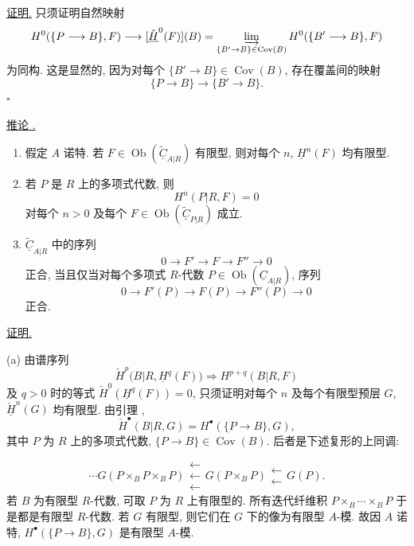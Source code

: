 \underline{证明.} 只须证明自然映射
\[
 H^0(\{P\longrightarrow B\},F)
 \longrightarrow[\check{\underline H}^{0}(F)](B)
 =\varinjlim_{\{B'\to B\}\in\operatorname{Cov}(B)}
   H^0(\{B'\longrightarrow B\},F)
\]
为同构. 这是显然的, 因为对每个
$\{B'\longrightarrow B\}\in\operatorname{Cov}(B)$, 存在覆盖间的映射
\[
 \{P\longrightarrow B\}\longrightarrow
 \{B'\longrightarrow B\}.
\]
\hfill$\square$

\underline{推论 .}

\begin{enumerate}[label=(\alph*)]
\item 假定 $A$ 诺特. 若
$F\in\operatorname{Ob}(\widetilde{\underline C}_{A|R})$ 有限型,
则对每个 $n$, $\underline H^n(F)$ 均有限型.

\item 若 $P$ 是 $R$ 上的多项式代数, 则
\[
 H^n(P|R,F)=0
\]
对每个 $n>0$ 及每个 $F\in\operatorname{Ob}(\widetilde{\underline C}_{P|R})$ 成立.

\item $\widetilde{\underline C}_{A|R}$ 中的序列
\[
 0\longrightarrow F'\longrightarrow F\longrightarrow F''
 \longrightarrow0
\]
正合, 当且仅当对每个多项式 $R$-代数
$P\in\operatorname{Ob}(\underline C_{A|R})$, 序列
\[
 0\longrightarrow F'(P)\longrightarrow F(P)
 \longrightarrow F''(P)\longrightarrow0
\]
正合.
\end{enumerate}

\underline{证明.}

(a) 由谱序列
\[
 \check H^p\bigl(B|R,\underline H^q(F)\bigr)
 \Longrightarrow H^{p+q}(B|R,F)
\]
及 $q>0$ 时的等式 $\check H^0(\underline H^q(F))=0$,
只须证明对每个 $n$ 及每个有限型预层 $G$,
$\check{\underline H}^{n}(G)$ 均有限型.
由引理 ,
\[
 \check H^{\bullet}(B|R,G)=
 H^{\bullet}(\{P\longrightarrow B\},G),
\]
其中 $P$ 为 $R$ 上的多项式代数,
$\{P\longrightarrow B\}\in\operatorname{Cov}(B)$.
后者是下述复形的上同调:


\[
 \cdots
 G(P\times_BP\times_BP)
 \mathrel{\substack{\longleftarrow\\[-.6ex]\longleftarrow\\[-.6ex]\longleftarrow}}
 G(P\times_BP)
 \mathrel{\substack{\longleftarrow\\[-.6ex]\longleftarrow}}
 G(P).
\]
若 $B$ 为有限型 $R$-代数, 可取 $P$ 为 $R$ 上有限型的.
所有迭代纤维积 $P\times_B\cdots\times_BP$ 于是都是有限型 $R$-代数.
若 $G$ 有限型, 则它们在 $G$ 下的像为有限型 $A$-模.
故因 $A$ 诺特, $H^{\bullet}(\{P\longrightarrow B\},G)$ 是有限型 $A$-模.

